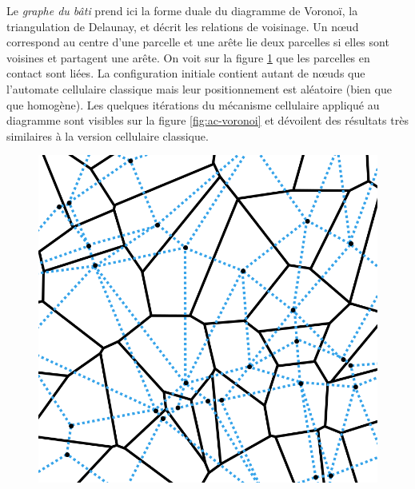 \documentclass[12pt]{article}
\begin{document}
Le \textit{graphe du bâti} prend ici la forme duale du diagramme de
Voronoï, la triangulation de Delaunay, et décrit les relations de
voisinage. Un n\oe ud correspond au centre d'une parcelle et une arête
lie deux parcelles si elles sont voisines et partagent une arête. On
voit sur la figure \ref{fig:delaunay} que les parcelles en contact
sont liées. La configuration initiale contient autant de n\oe uds que
l'automate cellulaire classique mais leur positionnement est aléatoire
(bien que que homogène). Les quelques itérations du mécanisme
cellulaire appliqué au diagramme sont visibles sur la figure
\ref{fig:ac-voronoi} et dévoilent des résultats très similaires à la
version cellulaire classique.

\begin{figure}[H]
  \centering
  \includegraphics[width=.7\linewidth]{images/delaunay.png}
  \caption{}
  \label{fig:delaunay}
\end{figure}
\end{document}
